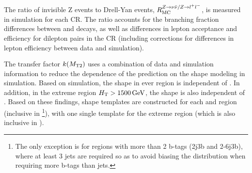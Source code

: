 The ratio of invisible Z events to Drell-Yan events, $R_{\mathrm{MC}}^{Z\rightarrow\nu\bar{\nu} / Z\rightarrow l^+ l^-}$, is measured in simulation for each CR. The ratio accounts for the branching fraction differences between \zll and \znunu decays, as well as differences in lepton acceptance and efficiency for dilepton pairs in the CR (including corrections for differences in lepton efficiency between data and simulation).

The transfer factor $k(M_{\mathrm{T2}})$ uses a combination of data and simulation information to reduce the dependence of the prediction on the \mttwo shape modeling in simulation. Based on simulation, the \mttwo shape in ever \HT region is independent of \nb. In addition, in the extreme \HT region $H_{\mathrm{T}} > 1500\,\text{Ge\hspace{-.08em}V}$, the shape is also independent of \nj. Based on these findings, \mttwo shape templates are constructed for each \HT and \nj region (inclusive in \nb\footnote{The only exception is for regions with more than 2 b-tags (2j3b and 2-6j3b), where at least 3 jets are required so as to avoid biasing the \nj distribution when requiring more b-tags than jets.}), with one single template for the extreme \HT region (which is also inclusive in \nj). 

